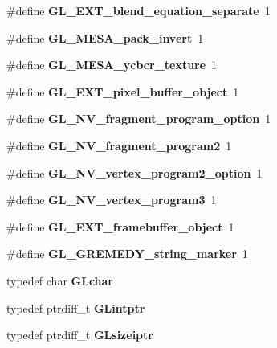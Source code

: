\begin{DoxyCompactItemize}
\item 
\#define {\bfseries G\+L\+\_\+\+E\+X\+T\+\_\+blend\+\_\+equation\+\_\+separate}~1\label{_s_d_l__opengl_8h_a6a911c276d73db9e85216789269584cc}

\item 
\#define {\bfseries G\+L\+\_\+\+M\+E\+S\+A\+\_\+pack\+\_\+invert}~1\label{_s_d_l__opengl_8h_a2e8fccab44e86657b79ad9409181f714}

\item 
\#define {\bfseries G\+L\+\_\+\+M\+E\+S\+A\+\_\+ycbcr\+\_\+texture}~1\label{_s_d_l__opengl_8h_aea3d364fbd326fe38e1b1512e5a0c835}

\item 
\#define {\bfseries G\+L\+\_\+\+E\+X\+T\+\_\+pixel\+\_\+buffer\+\_\+object}~1\label{_s_d_l__opengl_8h_aa40cd0fdb6ba128c275b5be0112f16ee}

\item 
\#define {\bfseries G\+L\+\_\+\+N\+V\+\_\+fragment\+\_\+program\+\_\+option}~1\label{_s_d_l__opengl_8h_ae00827f3e29b57d52a998f02e76e8c61}

\item 
\#define {\bfseries G\+L\+\_\+\+N\+V\+\_\+fragment\+\_\+program2}~1\label{_s_d_l__opengl_8h_a215aacabc54d28b35a7962ce16aaea48}

\item 
\#define {\bfseries G\+L\+\_\+\+N\+V\+\_\+vertex\+\_\+program2\+\_\+option}~1\label{_s_d_l__opengl_8h_adef06c945d7d7fded2f43306bbd785d0}

\item 
\#define {\bfseries G\+L\+\_\+\+N\+V\+\_\+vertex\+\_\+program3}~1\label{_s_d_l__opengl_8h_aa10c916c3dffae48d6eb2d0da510d5e1}

\item 
\#define {\bfseries G\+L\+\_\+\+E\+X\+T\+\_\+framebuffer\+\_\+object}~1\label{_s_d_l__opengl_8h_a8cfbfba877bf7f1760de1c15ef6cc682}

\item 
\#define {\bfseries G\+L\+\_\+\+G\+R\+E\+M\+E\+D\+Y\+\_\+string\+\_\+marker}~1\label{_s_d_l__opengl_8h_acd9fae209efa623a7868244c1f1cb43f}

\item 
typedef char {\bfseries G\+Lchar}\label{_s_d_l__opengl_8h_af7575655ac056b187ea385966b95a22d}

\item 
typedef ptrdiff\+\_\+t {\bfseries G\+Lintptr}\label{_s_d_l__opengl_8h_a0374caf1f25a139da21f84d81f637c23}

\item 
typedef ptrdiff\+\_\+t {\bfseries G\+Lsizeiptr}\label{_s_d_l__opengl_8h_aa4edc01036f13fcf17e0b1baf6c70ea7}


\end{DoxyCompactItemize}
